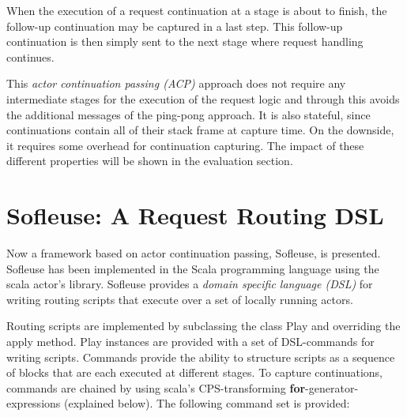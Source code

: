 \documentclass{sig-alternate}
\begin{document}
When the execution of a request continuation at a stage is about to finish, the follow-up 
continuation may be captured in a last step.  This follow-up continuation is then simply sent
to the next stage where request handling continues.  

This \emph{actor continuation passing (ACP)} approach does not require any intermediate stages for
the execution of the request logic and through this avoids the additional messages of the ping-pong
approach. It is also stateful, since continuations contain all of their stack frame at
capture time. On the downside, it requires some overhead for continuation capturing. The impact of
these different properties will be shown in the evaluation section.

                         



\section{Sofleuse: A Request Routing DSL}

Now a framework based on actor continuation passing, Sofleuse, is presented. Sofleuse has been
implemented in the Scala programming language using the scala actor's library. Sofleuse provides a
\emph{domain specific language (DSL)} for writing routing scripts that execute over a set of locally
running actors.

Routing scripts are implemented by subclassing the class Play and overriding the apply method. Play
instances are provided with a set of DSL-commands for writing scripts. Commands provide the ability
to structure scripts as a sequence of blocks that are each executed at different stages. To capture
continuations, commands are chained by using scala's CPS-transforming \textbf{for}-generator-expressions
(explained below). The following command set is provided:
\end{document}
